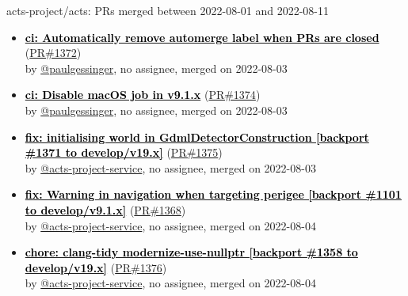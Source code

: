 \begin{frame}[allowframebreaks]{ acts-project/acts: PRs merged 
between 2022-08-01 and 2022-08-11
}
\begin{itemize}
    \item\prmerged
    \hspace*{0.1em}
    \textbf{\href{https://github.com/acts-project/acts/pull/1372}{\textcolor{black}{ci: Automatically remove automerge label when PRs are closed}}}
    (\href{https://github.com/acts-project/acts/pull/1372}{PR\#1372}) \\
    by \href{https://github.com/paulgessinger}{@paulgessinger}, {}no assignee, merged on 2022-08-03

    \item\prmerged
    \hspace*{0.1em}
    \textbf{\href{https://github.com/acts-project/acts/pull/1374}{\textcolor{black}{ci: Disable macOS job in v9.1.x}}}
    (\href{https://github.com/acts-project/acts/pull/1374}{PR\#1374}) \\
    by \href{https://github.com/paulgessinger}{@paulgessinger}, {}no assignee, merged on 2022-08-03

    \item\prmerged
    \hspace*{0.1em}
    \textbf{\href{https://github.com/acts-project/acts/pull/1375}{\textcolor{black}{fix: initialising world in GdmlDetectorConstruction [backport \#1371 to develop/v19.x]}}}
    (\href{https://github.com/acts-project/acts/pull/1375}{PR\#1375}) \\
    by \href{https://github.com/acts-project-service}{@acts-project-service}, {}no assignee, merged on 2022-08-03

    \item\prmerged
    \hspace*{0.1em}
    \textbf{\href{https://github.com/acts-project/acts/pull/1368}{\textcolor{black}{fix: Warning in navigation when targeting perigee [backport \#1101 to develop/v9.1.x]}}}
    (\href{https://github.com/acts-project/acts/pull/1368}{PR\#1368}) \\
    by \href{https://github.com/acts-project-service}{@acts-project-service}, {}no assignee, merged on 2022-08-04

    \item\prmerged
    \hspace*{0.1em}
    \textbf{\href{https://github.com/acts-project/acts/pull/1376}{\textcolor{black}{chore: clang-tidy modernize-use-nullptr [backport \#1358 to develop/v19.x]}}}
    (\href{https://github.com/acts-project/acts/pull/1376}{PR\#1376}) \\
    by \href{https://github.com/acts-project-service}{@acts-project-service}, {}no assignee, merged on 2022-08-04


\end{itemize}
\end{frame}
